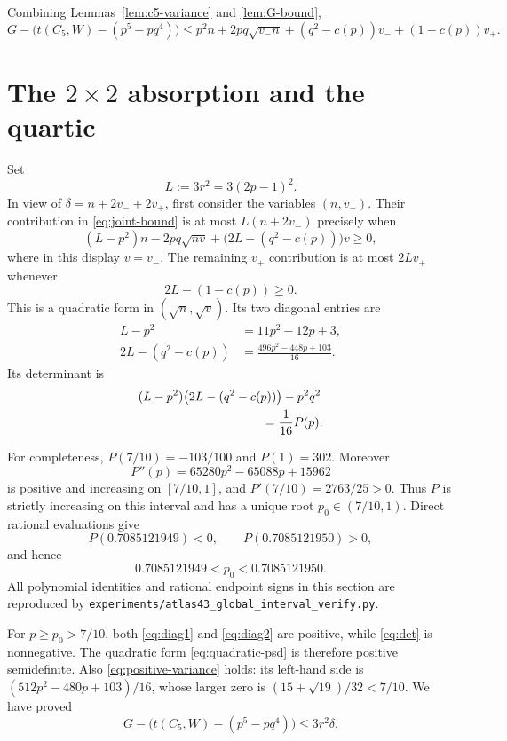 \documentclass[11pt]{article}
\theoremstyle{remark}
\begin{document}
Combining Lemmas~\ref{lem:c5-variance} and \ref{lem:G-bound},
\begin{equation}\label{eq:joint-bound}
 G-\bigl(t(C_5,W)-(p^5-pq^4)\bigr)
 \leq
 p^2n+2pq\sqrt{v_-n}
 +(q^2-c(p))v_-+(1-c(p))v_+.
\end{equation}

\section{The $2\times2$ absorption and the quartic}

Set
\[
 L:=3r^2=3(2p-1)^2.
\]
In view of $\delta=n+2v_-+2v_+$, first consider the variables
$(n,v_-)$.  Their contribution in \eqref{eq:joint-bound} is at most
$L(n+2v_-)$ precisely when
\begin{equation}\label{eq:quadratic-psd}
 (L-p^2)n-2pq\sqrt{nv}
 +\bigl(2L-(q^2-c(p))\bigr)v\geq0,
\end{equation}
where in this display $v=v_-$.  The remaining $v_+$ contribution is
at most $2Lv_+$ whenever
\begin{equation}\label{eq:positive-variance}
 2L-(1-c(p))\geq0.
\end{equation}
This is a quadratic form in $(\sqrt n,\sqrt v)$.  Its two diagonal
entries are
\begin{align}
 L-p^2&=11p^2-12p+3,\label{eq:diag1}\\
 2L-(q^2-c(p))&=\frac{496p^2-448p+103}{16}.\label{eq:diag2}
\end{align}
Its determinant is
\begin{equation}\label{eq:det}
 \begin{aligned}
 &(L-p^2)\bigl(2L-(q^2-c(p))\bigr)-p^2q^2\\
 &\hspace{35mm}=\frac1{16}P(p).
 \end{aligned}
\end{equation}

For completeness, $P(7/10)=-103/100$ and $P(1)=302$.  Moreover
\[
 P''(p)=65280p^2-65088p+15962
\]
is positive and increasing on $[7/10,1]$, and
$P'(7/10)=2763/25>0$.  Thus $P$ is strictly increasing on this interval
and has a unique root $p_0\in(7/10,1)$.  Direct rational evaluations give
\[
 P(0.7085121949)<0,
 \qquad
 P(0.7085121950)>0,
\]
and hence
\[
 0.7085121949<p_0<0.7085121950.
\]
All polynomial identities and rational endpoint signs in this section are
reproduced by
\texttt{experiments/atlas43\_global\_interval\_verify.py}.

For $p\geq p_0>7/10$, both \eqref{eq:diag1} and
\eqref{eq:diag2} are positive, while \eqref{eq:det} is nonnegative.
The quadratic form \eqref{eq:quadratic-psd} is therefore positive
semidefinite.  Also \eqref{eq:positive-variance} holds: its left-hand
side is $(512p^2-480p+103)/16$, whose larger zero is
$(15+\sqrt{19})/32<7/10$.  We have proved
\begin{equation}\label{eq:absorption}
 G-\bigl(t(C_5,W)-(p^5-pq^4)\bigr)
 \leq3r^2\delta.
\end{equation}
\end{document}
